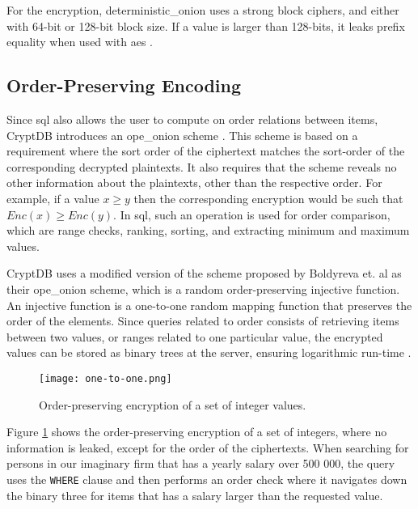\noindent
For the encryption, \gls{deterministic_onion} uses a strong block ciphers, and either with 64-bit or 128-bit block size. If a value is larger than 128-bits, it leaks  prefix equality when used with \gls{aes} \citep{CryptDB_Main_Paper}.



\subsection{Order-Preserving Encoding}
\label{sec:ope}

Since \Gls{sql} also allows the user to compute on order relations between items, CryptDB introduces an \Gls{ope_onion} scheme \citep{CryptDB_Main_Paper}. This scheme is based on a requirement where the sort order of the ciphertext matches the sort-order of the corresponding decrypted plaintexts. It also requires that the scheme reveals no other information about the plaintexts, other than the respective order. For example, if a value $x \ge y$ then the corresponding encryption would be such that $Enc(x) \ge Enc(y)$. In \Gls{sql}, such an operation is used for order comparison, which are range checks, ranking, sorting, and extracting minimum and maximum values. 

CryptDB uses a modified version of the scheme proposed by Boldyreva et. al \citep{ope_cryptdb} as their \gls{ope_onion} scheme, which is a random order-preserving injective function. An injective function is a one-to-one random mapping function that preserves the order of the elements. Since queries related to order consists of retrieving items between two values, or ranges related to one particular value, the encrypted values can be stored as binary trees at the server, ensuring logarithmic run-time \cite{ope_cryptdb}.


\begin{figure}[h]
	\texttt{[image: one-to-one.png]}
	\caption{Order-preserving encryption of a set of integer values.}
	\label{fig:ope_function}
\end{figure}

Figure \ref{fig:ope_function} shows the order-preserving encryption of a set of integers, where no information is leaked, except for the order of the ciphertexts. When searching for persons in our imaginary firm that has a yearly salary over 500 000, the query uses the \verb!WHERE! clause and then performs an order check where it navigates down the binary three for items that has a salary larger than the requested value.


